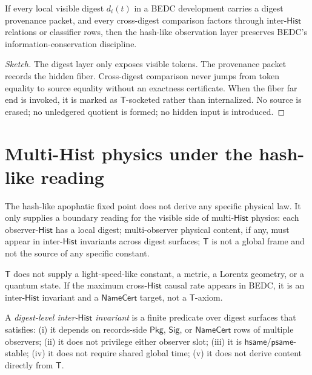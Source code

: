 \begin{theorem}
\label{thm:hash-like-info-conservation}
If every local visible digest $d_i(t)$ in a BEDC development carries a digest provenance packet, and every cross-digest comparison factors through inter-$\mathsf{Hist}$ relations or classifier rows, then the hash-like observation layer preserves BEDC's information-conservation discipline.
\end{theorem}

\begin{proof}[Sketch]
The digest layer only exposes visible tokens. The provenance packet records the hidden fiber. Cross-digest comparison never jumps from token equality to source equality without an exactness certificate. When the fiber far end is invoked, it is marked as $\mathsf{T}$-socketed rather than internalized. No source is erased; no unledgered quotient is formed; no hidden input is introduced.
\end{proof}

\section{Multi-Hist physics under the hash-like reading}
\label{sec:hash-like-multihist-physics}

The hash-like apophatic fixed point does not derive any specific physical law. It only supplies a boundary reading for the visible side of multi-$\mathsf{Hist}$ physics: each observer-$\mathsf{Hist}$ has a local digest; multi-observer physical content, if any, must appear in inter-$\mathsf{Hist}$ invariants across digest surfaces; $\mathsf{T}$ is not a global frame and not the source of any specific constant.

\begin{principle}
\label{prin:hash-like-T-not-physical-constant}
$\mathsf{T}$ does not supply a light-speed-like constant, a metric, a Lorentz geometry, or a quantum state. If the maximum cross-$\mathsf{Hist}$ causal rate appears in BEDC, it is an inter-$\mathsf{Hist}$ invariant and a $\mathsf{NameCert}$ target, not a $\mathsf{T}$-axiom.
\end{principle}

\begin{definition}
\label{def:hash-like-digest-inter-hist-invariant}
A \emph{digest-level inter-$\mathsf{Hist}$ invariant} is a finite predicate over digest surfaces that satisfies: (i) it depends on records-side $\mathsf{Pkg}$, $\mathsf{Sig}$, or $\mathsf{NameCert}$ rows of multiple observers; (ii) it does not privilege either observer slot; (iii) it is $\mathsf{hsame}$/$\mathsf{psame}$-stable; (iv) it does not require shared global time; (v) it does not derive content directly from $\mathsf{T}$.
\end{definition}

